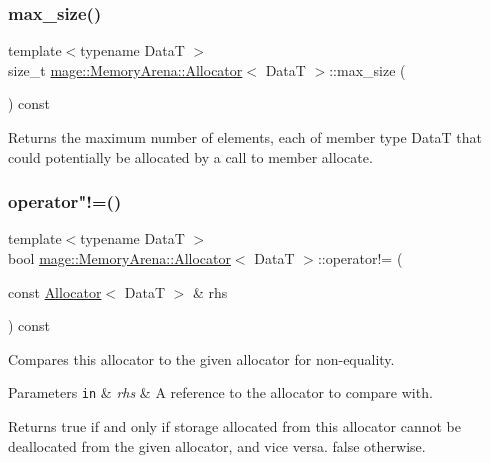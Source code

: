 \subsubsection{\texorpdfstring{max\+\_\+size()}{max\_size()}}
{\footnotesize\ttfamily template$<$typename DataT $>$ \\
size\+\_\+t \hyperlink{structmage_1_1_memory_arena_1_1_allocator}{mage\+::\+Memory\+Arena\+::\+Allocator}$<$ DataT $>$\+::max\+\_\+size (\begin{DoxyParamCaption}{ }\end{DoxyParamCaption}) const\hspace{0.3cm}{\ttfamily [noexcept]}}

Returns the maximum number of elements, each of member type {\ttfamily DataT} that could potentially be allocated by a call to member allocate. \hypertarget{structmage_1_1_memory_arena_1_1_allocator_ac1e8e59f0122286c96f73646c4d59f18}{}\label{structmage_1_1_memory_arena_1_1_allocator_ac1e8e59f0122286c96f73646c4d59f18} 
\subsubsection{\texorpdfstring{operator"!=()}{operator!=()}}
{\footnotesize\ttfamily template$<$typename DataT $>$ \\
bool \hyperlink{structmage_1_1_memory_arena_1_1_allocator}{mage\+::\+Memory\+Arena\+::\+Allocator}$<$ DataT $>$\+::operator!= (\begin{DoxyParamCaption}\item[{const \hyperlink{structmage_1_1_memory_arena_1_1_allocator}{Allocator}$<$ DataT $>$ \&}]{rhs }\end{DoxyParamCaption}) const\hspace{0.3cm}{\ttfamily [noexcept]}}

Compares this allocator to the given allocator for non-\/equality.


\begin{DoxyParams}[1]{Parameters}
\mbox{\tt in}  & {\em rhs} & A reference to the allocator to compare with. \\
\hline
\end{DoxyParams}
\begin{DoxyReturn}{Returns}
{\ttfamily true} if and only if storage allocated from this allocator cannot be deallocated from the given allocator, and vice versa. {\ttfamily false} otherwise. 
\end{DoxyReturn}
\hypertarget{structmage_1_1_memory_arena_1_1_allocator_ad9427ed4b443205b09d6db49b53d8441}{}\label{structmage_1_1_memory_arena_1_1_allocator_ad9427ed4b443205b09d6db49b53d8441} 
